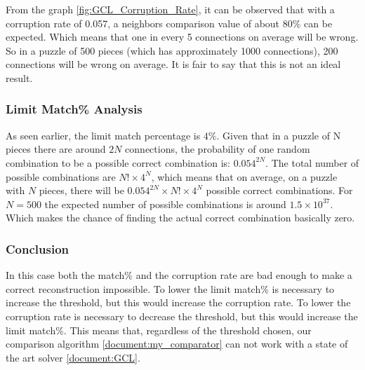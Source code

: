 \documentclass{article}
\begin{document}
From the graph \ref{fig:GCL_Corruption_Rate}, it can be observed that with a corruption rate of 0.057,
a neighbors comparison value of about 80\%
can be expected. Which means that one in every 5 connections on average will be wrong.
So in a puzzle of 500 pieces (which has approximately 1000 connections),
200 connections will be wrong on average.
It is fair to say that this is not an ideal result.


\subsubsection{Limit Match\% Analysis}
As seen earlier, the limit match percentage is \(4\%\).\newline \newline
Given that in a puzzle of N pieces there are around \(2N \) connections,
the probability of one random combination to be a
possible correct combination is: \(0.054^{2N}\).\newline \newline
The total number of possible combinations are \(N! \times 4^N\),
which means that on average, on a puzzle with \(N\) pieces,
there will be \(0.054^{2N} \times N! \times 4^N \)
possible correct combinations.\newline \newline
For \( N = 500 \) the expected number of possible combinations is around \( 1.5 \times 10^{37} \).
Which makes the chance of finding the actual correct combination basically zero.

\subsubsection{Conclusion}
In this case both the match\% and the corruption rate are bad enough to make a correct reconstruction impossible.
\newline \newline 
To lower the limit match\% is necessary to increase the threshold, but this would increase the corruption rate.
\newline \newline
To lower the corruption rate is necessary to decrease the threshold, but this would increase the limit match\%.
\newline \newline
This means that, regardless of the threshold chosen, our comparison algorithm \ref{document:my_comparator}
can not work with a state of the art solver \ref{document:GCL}.
\end{document}

